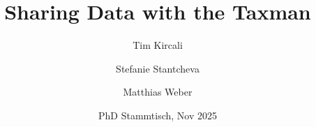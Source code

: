 \documentclass{beamer}
\title[Sharing Data with the Taxman]{Sharing Data with the Taxman} %
\author[Kircali, Stantcheva and Weber] %
{Tim Kircali\inst{1} \and Stefanie Stantcheva\inst{2} \and Matthias Weber\inst{1}}
\institute[] %
{
\inst{1} University of St.Gallen \\
\inst{2} Harvard University
}
{
\medskip

}
\date[St.Gallen, Nov 2025]{PhD Stammtisch, Nov 2025}
\begin{document}
\begin{frame}
\titlepage %
\end{frame}




\end{document}
